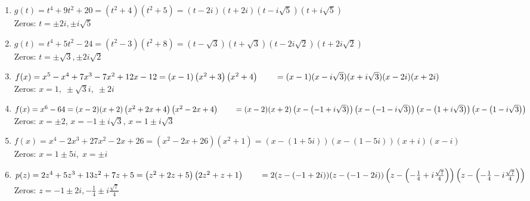 \documentclass{ximera}
\begin{document}
\begin{enumerate}
\item  $g(t) = t^4+9t^2+20 = \left(t^2+4\right) \left(t^2+5\right) = (t-2i)(t+2i)\left(t - i \sqrt{5}\right)\left(t + i \sqrt{5}\right)$\\
Zeros:  $t = \pm 2i, \pm i \sqrt{5}$
\item  $g(t) = t^4+5t^2-24 = \left(t^2-3 \right) \left(t^2+8\right) = (t-\sqrt{3})(t+\sqrt{3})\left(t - 2i \sqrt{2}\right)\left(t + 2i \sqrt{2}\right)$\\
Zeros:  $t = \pm \sqrt{3}, \pm 2i \sqrt{2}$

\item  $f(x) = x^5 - x^4+7x^3-7x^2+12x-12 = (x-1) \left(x^2 + 3\right) \left(x^2 + 4 \right) \\
\phantom{f(x)} = (x-1)(x - i \sqrt{3})(x + i \sqrt{3})(x-2i)(x+2i)$ \\
Zeros:  $x = 1, \;  \pm  \sqrt{3}i,  \; \pm 2i$
\item $f(x) = x^6 - 64 = (x-2)(x+2)\left(x^2+2x+4\right)\left(x^2-2x+4\right) \\
      \phantom{f(x)} = (x-2)(x+2)\left( x - \left( -1+i\sqrt{3} \right) \right)\left( x - \left( -1-i\sqrt{3} \right) \right)\left( x - \left( 1+i\sqrt{3} \right) \right)\left( x - \left( 1-i\sqrt{3} \right) \right)$ \\
Zeros:  $x = \pm 2$, $x = -1 \pm i\sqrt{3}$, $x = 1 \pm i\sqrt{3}$


\item $f(x) = x^{4} - 2x^{3} + 27x^{2} - 2x + 26 = (x^{2} - 2x + 26)(x^{2} + 1) = (x - (1 + 5i))(x - (1 - 5i))(x + i)(x - i)$\\ 
Zeros: $x = 1 \pm 5i, \; x = \pm i$
\item  $p(z) = 2z^4+5z^3+13z^2+7z+5 = \left(z^2+2z+5\right) \left(2z^2+z+1\right)  \\ \phantom{f(z)} = 2 (z-(-1+2i))(z-(-1-2i))\left(z - \left(-\frac{1}{4} + i \frac{\sqrt{7}}{4}\right) \right)\left(z - \left(-\frac{1}{4} - i \frac{\sqrt{7}}{4}\right) \right) $\\
Zeros:  $z = -1 \pm 2i, -\frac{1}{4} \pm i \frac{\sqrt{7}}{4}$

\setcounter{HW}{\value{enumi}}
\end{enumerate}
\end{document}

